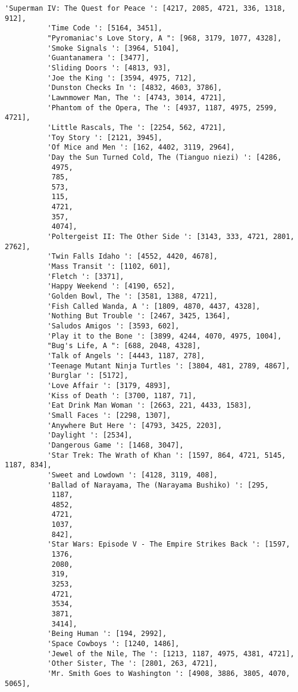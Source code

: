 \documentclass[11pt]{article}
\begin{document}
\begin{Verbatim}[commandchars=\\\{\}]
          'Superman IV: The Quest for Peace ': [4217, 2085, 4721, 336, 1318, 912],
          'Time Code ': [5164, 3451],
          "Pyromaniac's Love Story, A ": [968, 3179, 1077, 4328],
          'Smoke Signals ': [3964, 5104],
          'Guantanamera ': [3477],
          'Sliding Doors ': [4813, 93],
          'Joe the King ': [3594, 4975, 712],
          'Dunston Checks In ': [4832, 4603, 3786],
          'Lawnmower Man, The ': [4743, 3014, 4721],
          'Phantom of the Opera, The ': [4937, 1187, 4975, 2599, 4721],
          'Little Rascals, The ': [2254, 562, 4721],
          'Toy Story ': [2121, 3945],
          'Of Mice and Men ': [162, 4402, 3119, 2964],
          'Day the Sun Turned Cold, The (Tianguo niezi) ': [4286,
           4975,
           785,
           573,
           115,
           4721,
           357,
           4074],
          'Poltergeist II: The Other Side ': [3143, 333, 4721, 2801, 2762],
          'Twin Falls Idaho ': [4552, 4420, 4678],
          'Mass Transit ': [1102, 601],
          'Fletch ': [3371],
          'Happy Weekend ': [4190, 652],
          'Golden Bowl, The ': [3581, 1388, 4721],
          'Fish Called Wanda, A ': [1809, 4870, 4437, 4328],
          'Nothing But Trouble ': [2467, 3425, 1364],
          'Saludos Amigos ': [3593, 602],
          'Play it to the Bone ': [3899, 4244, 4070, 4975, 1004],
          "Bug's Life, A ": [688, 2048, 4328],
          'Talk of Angels ': [4443, 1187, 278],
          'Teenage Mutant Ninja Turtles ': [3804, 481, 2789, 4867],
          'Burglar ': [5172],
          'Love Affair ': [3179, 4893],
          'Kiss of Death ': [3700, 1187, 71],
          'Eat Drink Man Woman ': [2663, 221, 4433, 1583],
          'Small Faces ': [2298, 1307],
          'Anywhere But Here ': [4793, 3425, 2203],
          'Daylight ': [2534],
          'Dangerous Game ': [1468, 3047],
          'Star Trek: The Wrath of Khan ': [1597, 864, 4721, 5145, 1187, 834],
          'Sweet and Lowdown ': [4128, 3119, 408],
          'Ballad of Narayama, The (Narayama Bushiko) ': [295,
           1187,
           4852,
           4721,
           1037,
           842],
          'Star Wars: Episode V - The Empire Strikes Back ': [1597,
           1376,
           2080,
           319,
           3253,
           4721,
           3534,
           3871,
           3414],
          'Being Human ': [194, 2992],
          'Space Cowboys ': [1240, 1486],
          'Jewel of the Nile, The ': [1213, 1187, 4975, 4381, 4721],
          'Other Sister, The ': [2801, 263, 4721],
          'Mr. Smith Goes to Washington ': [4908, 3886, 3805, 4070, 5065],

\end{Verbatim}
\end{document}
